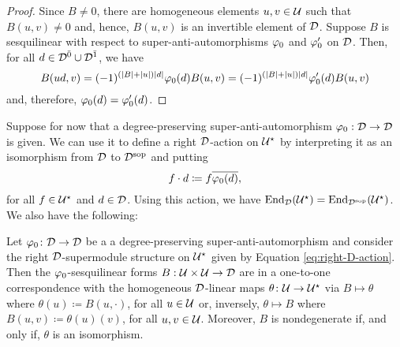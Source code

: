 \begin{proof}
	Since $B\neq 0$, there are homogeneous elements $u, v\in \mathcal U$ such that $B(u,v) \neq 0$ and, hence, $B(u,v)$ is an invertible element of $\mathcal{D}$.
	Suppose $B$ is sesquilinear with respect to super-anti-automorphisms $\varphi_0$ and $\varphi_0'$ on $\mathcal{D}$.
	Then, for all $d\in \mathcal{D}^{\bar0} \cup \mathcal{D}^{\bar1}$, we have
	\[ B(ud,v) = (-1)^ {(|B| + |u|)|d|} \varphi_0(d) B(u,v) = (-1)^ {(|B| + |u|)|d|} \varphi_0'(d) B(u,v) \]
	and, therefore, $\varphi_0(d) = \varphi_0'(d)$.
\end{proof}

Suppose for now that a degree-preserving su\-per\--an\-ti\--auto\-mor\-phism $\varphi_0: \mathcal{D} \to \mathcal{D}$ is given.
We can use it to define a right $\mathcal{D}$-action on $\mathcal U^\star$ by interpreting it as an isomorphism from $\mathcal{D}$ to $\mathcal{D}^{\mathrm{sop}}$ and putting
%
\begin{equation}\label{eq:right-D-action}
	f\cdot d \coloneqq f \overline{\varphi_0(d)},
\end{equation}
%
for all $f \in \mathcal U^\star$ and $d\in \mathcal{D}$.
Using this action, we have $\operatorname{End}_{\mathcal{D}} (\mathcal U^\star) = \operatorname{End}_{\mathcal{D}^{\mathrm{sop}}} (\mathcal U^\star)$. We also have the following:

\begin{prop}\label{prop:sesquilinear-form-iff-D-linear-map}
	Let $\varphi_0\colon \mathcal{D} \to \mathcal{D}$ be a a degree-preserving su\-per\--an\-ti\--auto\-mor\-phism and consider the right $\mathcal{D}$-supermodule structure on $\mathcal U^\star$ given by Equation \eqref{eq:right-D-action}.
	Then the $\varphi_0$-sesquilinear forms $B:\mathcal U\times\mathcal U \to \mathcal{D}$ are in a one-to-one correspondence with the homogeneous $\mathcal{D}$-linear maps $\theta\colon \mathcal U \to \mathcal U^\star$ via $B \mapsto \theta$ where $\theta(u) \coloneqq B(u, \cdot)$, for all $u \in \mathcal U$ or, inversely, $\theta \mapsto B$ where $B(u,v) \coloneqq \theta(u)(v)$, for all $u, v\in \mathcal U$.
	Moreover, $B$ is nondegenerate if, and only if, $\theta$ is an isomorphism.
\end{prop}

